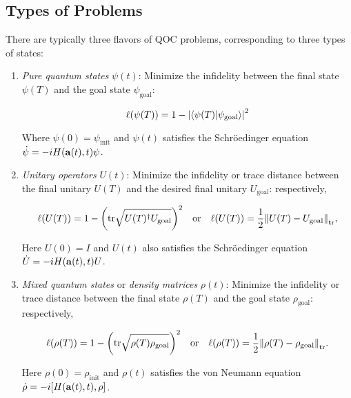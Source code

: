 \documentclass{article}
\begin{document}
\subsection{Types of Problems}
There are typically three flavors of QOC problems, corresponding to three types of states:

\begin{enumerate}
  \item \textit{Pure quantum states} $\psi(t)$: Minimize the infidelity between the final state $\psi(T)$ and the goal state $\psi_{\text{goal}}$:

  \begin{equation}
    \ell(\psi(T)) = 1 - \abs{\bra{\psi(T)} \ket{\psi_{\text{goal}}}}^2
  \end{equation}

  Where $\psi(0) = \psi_{\text{init}}$ and $\psi(t)$ satisfies the Schr\"oedinger equation $\dot \psi = -i H(\vb{a}(t), t) \psi$.

  \item \textit{Unitary operators} $U(t)$: Minimize the infidelity or trace distance between the final unitary $U(T)$ and the desired final unitary $U_{\text{goal}}$: respectively,
  
  \begin{equation}
    \ell(U(T)) = 1 - \qty(\text{tr}\sqrt{U(T)^\dagger U_{\text{goal}}})^2 
    \quad \text{or} \quad
    \ell(U(T)) = \frac{1}{2} \norm{U(T) - U_{\text{goal}}}_{\text{tr}},
  \end{equation}

  Here $U(0) = I$ and $U(t)$ also satisfies the Schr\"oedinger equation $\dot U = -i H(\vb{a}(t), t) U$.
  \item \textit{Mixed quantum states} or \textit{density matrices} $\rho(t)$:  Minimize the infidelity or trace distance between the final state $\rho(T)$ and the goal state $\rho_{\text{goal}}$: respectively,

  \begin{equation}
    \ell(\rho(T)) = 1 - \qty(\text{tr}\sqrt{\rho(T) \rho_{\text{goal}}})^2 
    \quad \text{or} \quad
    \ell(\rho(T)) = \frac{1}{2} \norm{\rho(T) - \rho_{\text{goal}}}_{\text{tr}}.
  \end{equation}

  Here $\rho(0) = \rho_{\text{init}}$ and $\rho(t)$ satisfies the von Neumann equation $\dot \rho = -i \qty[H(\vb{a}(t), t), \rho]$. 
  
\end{enumerate}
\end{document}
